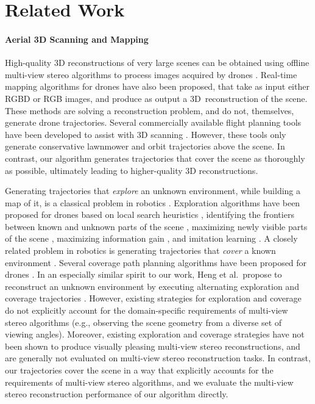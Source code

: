 \section{Related Work}

\paragraph{Aerial 3D Scanning and Mapping}
High-quality 3D reconstructions of very large scenes can be obtained using offline multi-view stereo algorithms \cite{furukawa:2015} to process images acquired by drones \cite{pix4d:2015}.
Real-time mapping algorithms for drones have also been proposed, that take as input either RGBD \cite{heng:2011,loianno:2015,michael:2012,sturm:2013} or RGB \cite{wendel:2012} images, and produce as output a 3D\ reconstruction of the scene.
These methods are solving a reconstruction problem, and do not, themselves, generate drone trajectories.
Several commercially available flight planning tools have been developed to assist with 3D scanning \cite{3dr:2017a,pix4d:2017a}.
However, these tools only generate conservative lawnmower and orbit trajectories above the scene.
In contrast, our algorithm generates trajectories that cover the scene as thoroughly as possible, ultimately leading to higher-quality 3D reconstructions.

Generating trajectories that \emph{explore} an unknown environment, while building a map of it, is a classical problem in robotics \cite{thrun:2005}.
Exploration algorithms have been proposed for drones based on local search heuristics \cite{stumberg:2016}, identifying the frontiers between known and unknown parts of the scene \cite{heng:2014,shen:2012}, maximizing newly visible parts of the scene \cite{bircher:2016}, maximizing information gain \cite{charrow:2015b,charrow:2015a}, and imitation learning \cite{choudhury:2017}.
A closely related problem in robotics is generating trajectories that \emph{cover} a known environment \cite{galceran:2013}.
Several coverage path planning algorithms have been proposed for drones \cite{alexis:2015,bircher:2015,heng:2015,hollinger:2013}.
In an especially similar spirit to our work, Heng et al.~propose to reconstruct an unknown environment by executing alternating exploration and coverage trajectories \cite{heng:2015}.
However, existing strategies for exploration and coverage do not explicitly account for the domain-specific requirements of multi-view stereo algorithms (e.g., observing the scene geometry from a diverse set of viewing angles).
Moreover, existing exploration and coverage strategies have not been shown to produce visually pleasing multi-view stereo reconstructions, and are generally not evaluated on multi-view stereo reconstruction tasks.
In contrast, our trajectories cover the scene in a way that explicitly accounts for the requirements of multi-view stereo algorithms, and we evaluate the multi-view stereo reconstruction performance of our algorithm directly.

